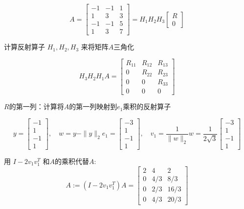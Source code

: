\begin{problem}
    \begin{equation} A=\left[\begin{array}{rrr}-1 & -1 & 1 \\ 1 & 3 & 3 \\ -1 & -1 & 5 \\ 1 & 3 & 7\end{array}\right]=H_{1} H_{2} H_{3}\left[\begin{array}{l}R \\ 0\end{array}\right] \end{equation}

    计算反射算子 $ H_{1}, H_{2}, H_{3} $ 来将矩阵$A$三角化

    \begin{equation} H_{3} H_{2} H_{1} A=\left[\begin{array}{ccc}R_{11} & R_{12} & R_{13} \\ 0 & R_{22} & R_{23} \\ 0 & 0 & R_{33} \\ 0 & 0 & 0\end{array}\right] \end{equation}

    $R$的第一列：计算将$A$的第一列映射到$e_1$乘积的反射算子

    \begin{equation}
y=\left[\begin{array}{r}
-1 \\
1 \\
-1 \\
1
\end{array}\right], \quad w=y-\|y\|_{2} e_{1}=\left[\begin{array}{r}
-3 \\
1 \\
-1 \\
1
\end{array}\right], \quad v_{1}=\frac{1}{\|w\|_{2}} w=\frac{1}{2 \sqrt{3}}\left[\begin{array}{r}
-3 \\
1 \\
-1 \\
1
\end{array}\right]
\end{equation}

用 $I-2 v_{1} v_{1}^{T}$ 和$A$的乘积代替$A$:
\begin{equation}
A:=\left(I-2 v_{1} v_{1}^{T}\right) A=\left[\begin{array}{ccc}
2 & 4 & 2 \\
0 & 4 / 3 & 8 / 3 \\
0 & 2 / 3 & 16 / 3 \\
0 & 4 / 3 & 20 / 3
\end{array}\right]
\end{equation}


\end{problem}
